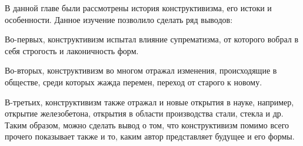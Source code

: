 В данной главе были рассмотрены история конструктивизма, его истоки и особенности.
Данное изучение позволило сделать ряд выводов:

Во-первых, конструктивизм испытал влияние супрематизма, от которого вобрал в себя
строгость и лаконичность форм.

Во-вторых, конструктивизм во многом отражал изменения, происходящие в обществе,
среди которых жажда перемен, переход от старого к новому.

В-третьих, конструктивизм также отражал и новые открытия в науке, например, открытие
железобетона, открытия в области производства стали, стекла и др.
Таким образом, можно сделать вывод о том, что конструктивизм помимо всего прочего
показывает также и то, каким автор представляет будущее и его формы.

% 
% 
